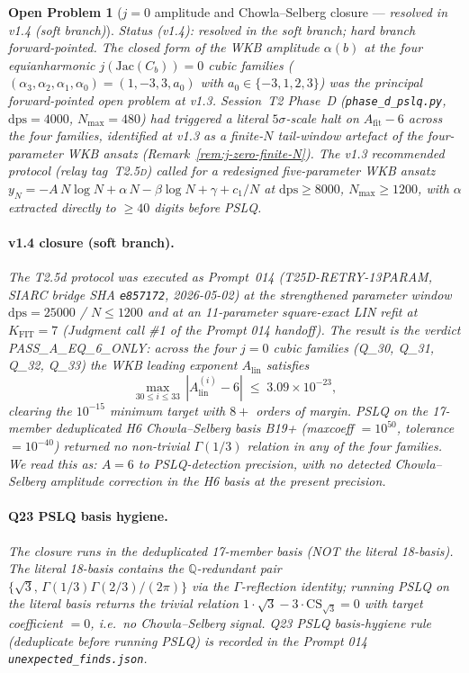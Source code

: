 \documentclass[11pt,a4paper]{article}
\newtheorem{problem}{Open Problem}
\theoremstyle{definition}
\theoremstyle{remark}
\begin{document}
\begin{problem}[$j=0$ amplitude and Chowla--Selberg
closure --- \emph{resolved in v1.4 (soft branch)}]\label{op:j-zero-amplitude-h6}
\emph{Status (v1.4): resolved in the soft branch; hard branch forward-pointed.}
The closed form of the WKB amplitude $\alpha(b)$ at the four equianharmonic
$j(\mathrm{Jac}(C_b))=0$ cubic families
($(\alpha_3,\alpha_2,\alpha_1,\alpha_0) = (1,-3,3,a_0)$ with
$a_0\in\{-3,1,2,3\}$) was the principal forward-pointed open problem at
v1.3. Session~T2 Phase~D (\texttt{phase\_d\_pslq.py}, $\mathrm{dps}=4000$,
$N_{\max}=480$) had triggered a literal $5\sigma$-scale halt on
$A_{\mathrm{fit}}-6$ across the four families, identified at v1.3 as a
finite-$N$ tail-window artefact of the four-parameter WKB ansatz
(Remark~\ref{rem:j-zero-finite-N}). The v1.3 recommended protocol
(relay tag~\textsc{T2.5d}) called for a redesigned five-parameter WKB ansatz
$y_N = -A\,N\log N + \alpha\,N - \beta\log N + \gamma + c_1/N$ at
$\mathrm{dps}\ge 8000$, $N_{\max}\ge 1200$, with $\alpha$ extracted directly
to ${\ge}40$ digits before PSLQ.

\paragraph{v1.4 closure (soft branch).}
The T2.5d protocol was executed as Prompt~014 (T25D-RETRY-13PARAM, SIARC
bridge SHA \texttt{e857172}, 2026-05-02) at the strengthened parameter
window $\mathrm{dps}=25000$ / $N \le 1200$ and at an 11-parameter
square-exact LIN refit at $K_{\mathrm{FIT}}=7$ (Judgment call \#1 of the
Prompt 014 handoff).  The result is the verdict
\textsf{PASS\_A\_EQ\_6\_ONLY}: across the four $j=0$ cubic families
(Q\_30, Q\_31, Q\_32, Q\_33) the WKB leading exponent $A_{\mathrm{lin}}$
satisfies
\[
   \max_{30 \le i \le 33}\, |A_{\mathrm{lin}}^{(i)} - 6|
   \;\le\; 3.09\times 10^{-23},
\]
clearing the $10^{-15}$ minimum target with $8+$ orders of margin.
PSLQ on the 17-member deduplicated H6 Chowla--Selberg basis B19+
(maxcoeff $=10^{50}$, tolerance $=10^{-40}$) returned \emph{no}
non-trivial $\Gamma(1/3)$ relation in any of the four families.
We read this as: $A=6$ to PSLQ-detection precision, with no detected
Chowla--Selberg amplitude correction in the H6 basis at the present
precision.

\paragraph{Q23 PSLQ basis hygiene.}
The closure runs in the \emph{deduplicated} 17-member basis (NOT the
literal 18-basis). The literal 18-basis contains the
$\mathbb{Q}$-redundant pair
$\{\sqrt{3},\,\Gamma(1/3)\Gamma(2/3)/(2\pi)\}$ via the
$\Gamma$-reflection identity; running PSLQ on the literal basis
returns the trivial relation
$1\cdot\sqrt{3} - 3\cdot\mathrm{CS}_{\sqrt{3}} = 0$
with target coefficient $=0$, i.e.\ no Chowla--Selberg signal. Q23
PSLQ basis-hygiene rule (deduplicate before running PSLQ) is recorded
in the Prompt 014 \texttt{unexpected\_finds.json}.


\end{problem}
\end{document}
